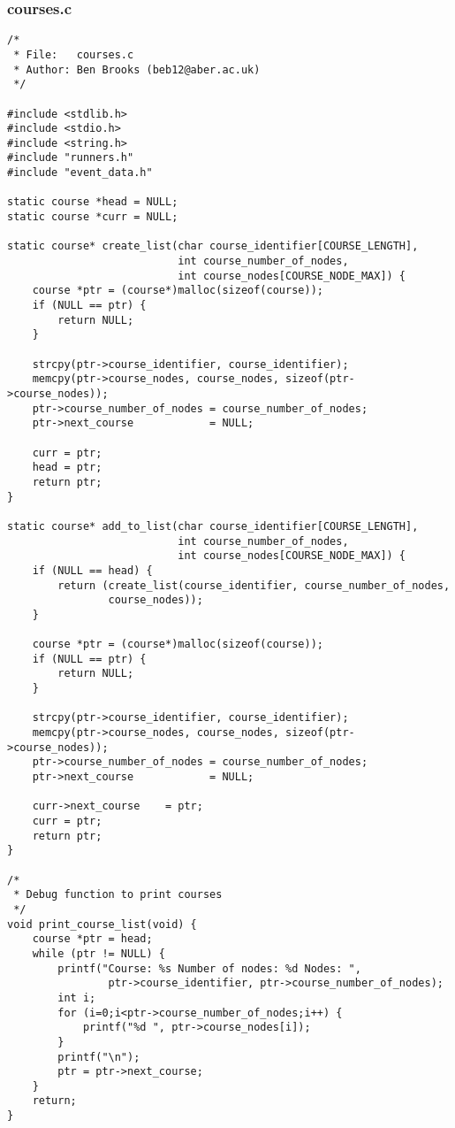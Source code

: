 \documentclass[pdftex,12pt,a4paper]{article}
\begin{document}
\subsubsection{courses.c}
\begin{verbatim}
/*
 * File:   courses.c
 * Author: Ben Brooks (beb12@aber.ac.uk)
 */

#include <stdlib.h>
#include <stdio.h>
#include <string.h>
#include "runners.h"
#include "event_data.h"

static course *head = NULL;
static course *curr = NULL;

static course* create_list(char course_identifier[COURSE_LENGTH],
						   int course_number_of_nodes,
						   int course_nodes[COURSE_NODE_MAX]) {
    course *ptr = (course*)malloc(sizeof(course));
    if (NULL == ptr) {
        return NULL;
    }

    strcpy(ptr->course_identifier, course_identifier);
    memcpy(ptr->course_nodes, course_nodes, sizeof(ptr->course_nodes));
    ptr->course_number_of_nodes = course_number_of_nodes;
    ptr->next_course            = NULL;

    curr = ptr;
    head = ptr;
    return ptr;
}

static course* add_to_list(char course_identifier[COURSE_LENGTH],
						   int course_number_of_nodes,
						   int course_nodes[COURSE_NODE_MAX]) {
    if (NULL == head) {
        return (create_list(course_identifier, course_number_of_nodes,
        		course_nodes));
    }

    course *ptr = (course*)malloc(sizeof(course));
    if (NULL == ptr) {
        return NULL;
    }

    strcpy(ptr->course_identifier, course_identifier);
    memcpy(ptr->course_nodes, course_nodes, sizeof(ptr->course_nodes));
    ptr->course_number_of_nodes = course_number_of_nodes;
    ptr->next_course            = NULL;

    curr->next_course    = ptr;
    curr = ptr;
    return ptr;
}

/*
 * Debug function to print courses
 */
void print_course_list(void) {
    course *ptr = head;
    while (ptr != NULL) {
        printf("Course: %s Number of nodes: %d Nodes: ",
        		ptr->course_identifier, ptr->course_number_of_nodes);
        int i;
        for (i=0;i<ptr->course_number_of_nodes;i++) {
            printf("%d ", ptr->course_nodes[i]);
        }
        printf("\n");
        ptr = ptr->next_course;
    }
    return;
}


\end{verbatim}
\end{document}

